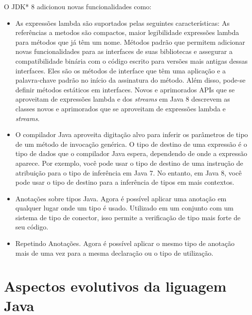 	O JDK* 8 adicionou novas funcionalidades como:
	  \begin{itemize}
		  \item As expressões lambda são suportados pelas seguintes características: As referências a metodos são compactos, maior legibilidade expressões lambda para métodos que já têm um nome. Métodos padrão que permitem adicionar novas funcionalidades para as interfaces de suas bibliotecas e assegurar a compatibilidade binária com o código escrito para versões mais antigas dessas interfaces. Eles são os métodos de interface que têm uma aplicação e a palavra-chave padrão no início da assinatura do método. Além disso, pode-se definir métodos estáticos em interfaces. Novos e aprimorados APIs que se aproveitam de expressões lambda e dos {\it streams} em Java 8 descrevem as classes novos e aprimorados que se aproveitam de expressões lambda e {\it streams}.
		  \item O compilador Java aproveita digitação alvo para inferir os parâmetros de tipo de um método de invocação genérica. O tipo de destino de uma expressão é o tipo de dados que o compilador Java espera, dependendo de onde a expressão aparece. Por exemplo, você pode usar o tipo de destino de uma instrução de atribuição para o tipo de inferência em Java 7. No entanto, em Java 8, você pode usar o tipo de destino para a inferência de tipos em mais contextos.
		  \item Anotações sobre tipos Java. Agora é possível aplicar uma anotação em qualquer lugar onde um tipo é usado. Utilizado em um conjunto com um sistema de tipo de conector, isso permite a verificação de tipo mais forte de seu código.
		  \item  Repetindo Anotações. Agora é possível aplicar o mesmo tipo de anotação mais de uma vez para a mesma declaração ou o tipo de utilização.
	  \end{itemize}
  
	\section {Aspectos evolutivos da liguagem Java}
